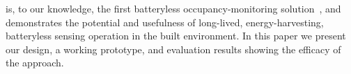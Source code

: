 \noind
\sysname is, to our knowledge, the first batteryless occupancy-monitoring solution~\cite{desai2018, sorber_tobias_2022}, and demonstrates the potential and usefulness of long-lived, energy-harvesting, batteryless sensing operation in the built environment. %
In this paper we present our design, a working prototype, and evaluation results showing the efficacy of the approach.


